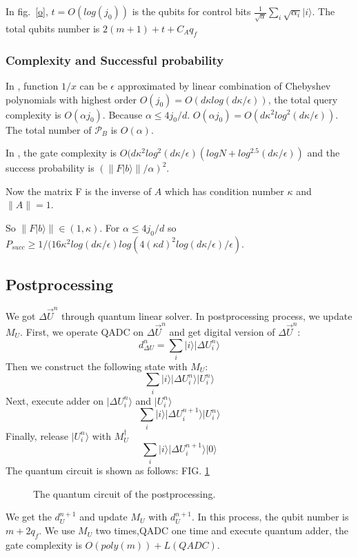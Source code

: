 \documentclass[%
 reprint,
 amsmath,amssymb,
pra,
]{revtex4-1}
\begin{document}
In fig.~\ref{o}, $t=O(log(j_0))$ is the qubits for control bits  $\frac{1}
{\sqrt{\alpha}}\sum_i\sqrt{\alpha_i}|i\rangle$. The total qubits number is $2(m+1)+t+C_Aq_f$

\subsubsection{Complexity and Successful probability}
In \cite{doi:10.1137/16M1087072}, function $1/x$ can be $\epsilon$ approximated by
linear combination of Chebyshev polynomials with highest order 
$O(j_0)=O(d\kappa log(d\kappa/\epsilon))$, the total
query complexity is $O(\alpha j_0)$. Because $\alpha\leqslant 4j_0/d$.
$O(\alpha j_0)=O(d\kappa^2log^2(d\kappa/\epsilon))$. The total number of 
$\mathcal{P}_B$ is $O(\alpha)$.

In \cite{7354428}, the gate complexity is $O(d\kappa^2log^2(d\kappa/
\epsilon)(logN+log^{2.5}(d\kappa/\epsilon))$
and the success probability is 
$(\lVert F|b\rangle\rVert/\alpha)^2$. 

Now the matrix F is the inverse of $A$ 
which has condition number $\kappa$ and $\lVert A\rVert=1$. 

So $\lVert F|b\rangle\rVert\in (1, \kappa)$. For $\alpha\leqslant4j_0/d$ so
$P_{succ}\geqslant 1/(16\kappa^2 log(d\kappa/\epsilon) log(4(\kappa d)^2log(d
\kappa/\epsilon)/\epsilon)$. 


\subsection{Postprocessing}

We got $\Delta \vec{U}^n$ through quantum linear solver. In postprocessing process, we update $M_U$. First, we operate QADC on $\Delta \vec{U}^n$ and get digital version of $\Delta \vec{U}^n$:
$$
d_{\Delta U}^n=\sum_i{|i\rangle|\Delta U_i^n\rangle}
$$
Then we construct the following state with $M_U$:
$$
\sum_i{|i\rangle|\Delta U_i^n\rangle|U_i^n\rangle}
$$
Next, execute adder on $|\Delta U_i^n\rangle$ and $|U_i^n\rangle$
$$
\sum_i{|i\rangle|\Delta U_i^{n+1}\rangle|U_i^n\rangle}
$$
Finally, release $|U_i^n\rangle$ with $M_U^{\dagger}$
$$
\sum_i{|i\rangle|\Delta U_i^{n+1}\rangle|0\rangle}
$$
The quantum circuit is shown as follows: FIG. \ref{postprocessing_qcir}
\begin{figure}[htbp]
	 \caption{The quantum circuit of the postprocessing.}
	\label{postprocessing_qcir}
   \end{figure}
We get the $d_U^{n+1}$ and update $M_U$ with $d_U^{n+1}$. In this process, the qubit number is $m+2q_f$. We use $M_U$ two times,QADC one time and execute quantum adder, the gate complexity is $O(poly(m))+L(QADC)$.
\end{document}
